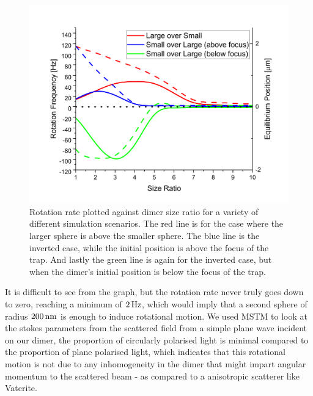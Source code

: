 \begin{figure}[h]
  \centering
  \includegraphics[width=0.65\linewidth]{rotation_rate_vs_size.png}
  \caption{Rotation rate plotted against dimer size ratio for a variety of different simulation scenarios. The red line is for the case where the larger sphere is above the smaller sphere. The blue line is the inverted case, while the initial position is above the focus of the trap. And lastly the green line is again for the inverted case, but when the dimer's initial position is below the focus of the trap.}
\end{figure}

It is difficult to see from the graph, but the rotation rate never
truly goes down to zero, reaching a minimum of $2\,{\rm Hz}$, which would
imply that a second sphere of radius $200\,{\rm nm}$ is enough to
induce rotational motion.  We used MSTM to look at the stokes
parameters from the scattered field from a simple plane wave incident
on our dimer, the proportion of circularly polarised light is minimal
compared to the proportion of plane polarised light, which indicates
that this rotational motion is not due to any inhomogeneity in the
dimer that might impart angular momentum to the scattered beam - as
compared to a anisotropic scatterer like Vaterite.

